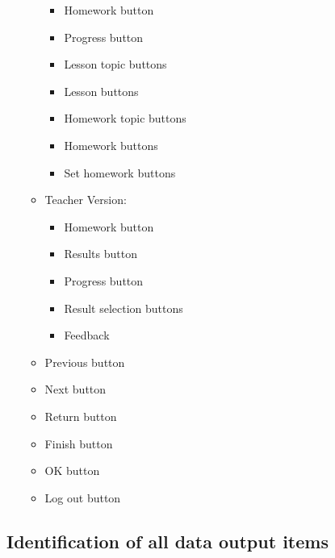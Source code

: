 \begin{itemize}
\begin{itemize}
\begin{itemize}
			\item Homework button
			\item Progress button
			\item Lesson topic buttons	
			\item Lesson buttons
			\item Homework topic buttons
			\item Homework buttons
			\item Set homework buttons
		\end{itemize}
		\item Teacher Version:
		\begin{itemize}
			\item Homework button
			\item Results button
			\item Progress button
			\item Result selection buttons
			\item Feedback
		\end{itemize}
		\item Previous button
		\item Next button
		\item Return button
		\item Finish button
		\item OK button
		\item Log out button
	\end{itemize}
\end{itemize}

\subsection{Identification of all data output items}

